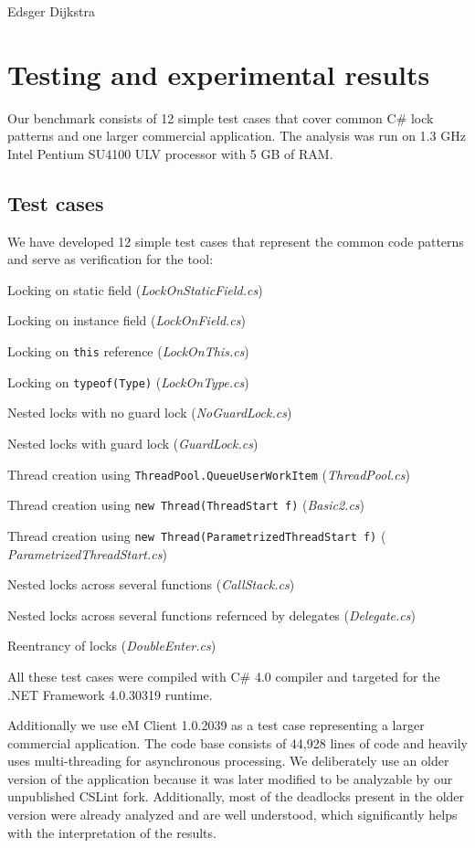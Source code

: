 %
         {Edsger Dijkstra}
\chapter{Testing and experimental results}

Our benchmark consists of 12 simple test cases that cover common C\# lock patterns and one larger commercial application. The analysis was run on 1.3 GHz Intel Pentium SU4100 ULV processor with 5 GB of RAM.

\section{Test cases}

We have developed 12 simple test cases that represent the common code patterns and serve as verification for the tool:
\begin{itemize*}
\item Locking on static field (\textit{LockOnStaticField.cs})
\item Locking on instance field (\textit{LockOnField.cs})
\item Locking on \texttt{this} reference (\textit{LockOnThis.cs})
\item Locking on \texttt{typeof(Type)} (\textit{LockOnType.cs})  
\item Nested locks with no guard lock (\textit{NoGuardLock.cs})
\item Nested locks with guard lock (\textit{GuardLock.cs})
\item Thread creation using \texttt{ThreadPool.QueueUserWorkItem} (\textit{ThreadPool.cs})
\item Thread creation using \texttt{new Thread(ThreadStart f)} (\textit{Basic2.cs}) 
\item Thread creation using \texttt{new Thread(ParametrizedThreadStart f)} ( \textit{ParametrizedThreadStart.cs})
\item Nested locks across several functions (\textit{CallStack.cs})
\item Nested locks across several functions refernced by delegates (\textit{Delegate.cs})
\item Reentrancy of locks (\textit{DoubleEnter.cs}) 
\end{itemize*}
All these test cases were compiled with C\# 4.0 compiler and targeted for the .NET Framework 4.0.30319 runtime.

Additionally we use eM Client 1.0.2039 as a test case representing a larger commercial application. The code base consists of 44,928 lines of code and heavily uses multi-threading for asynchronous processing. We deliberately use an older version of the application because it was later modified to be analyzable by our unpublished CSLint fork. Additionally, most of the deadlocks present in the older version were already analyzed and are well understood, which significantly helps with the interpretation of the results.

